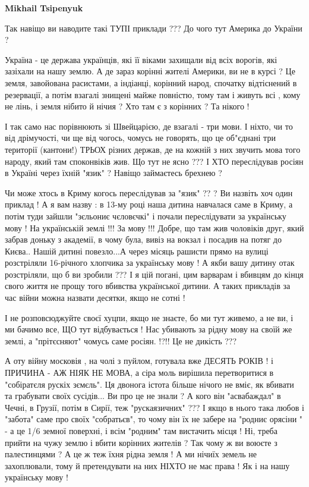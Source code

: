 \begin{itemize}
\begin{itemize}
\begin{itemize}
\textbf{Mikhail Tsipenyuk} 

Так навіщо ви наводите такі ТУПІ приклади ??? До чого тут Америка до України ?

Україна - це держава українців, які її віками захищали від всіх ворогів, які
зазіхали на нашу землю. А де зараз корінні жителі Америки, ви не в курсі ? Це
земля, завойована расистами, а індіанці, корінний народ, спочатку відтіснений в
резервації, а потім взагалі знищені майже повністю, тому там і живуть всі ,
кому не лінь, і земля нібито й нічия ? Хто там є з корінних ? Та нікого ! 

І так само нас порівнюють зі Швейцарією, де взагалі - три мови. І ніхто, чи то
від дрімучості, чи ще від чогось, чомусь не говорять, що це об"єднані три
території (кантони!) ТРЬОХ різних держав, де на кожній з них звучить мова того
народу, який там споконвіків жив. Що тут не ясно ??? І ХТО переслідував росіян
в Україні через їхній "язик" ? Навіщо займаєтесь брехнею ? 

Чи може хтось в Криму когось переслідував за "язик" ?? ? Ви назвіть хоч один
приклад ! А я вам назву : в 13-му році наша дитина навчалася саме в Криму, а
потім туди зайшли "зєльониє чєловєчкі" і почали переслідувати за українську
мову ! На українській землі !!! За мову !!! Добре, що там жив чоловіків друг,
який забрав доньку з академії, в чому була, вивіз на вокзал і посадив на потяг
до Києва.. Нашій дитині повезло...А через місяць рашисти прямо на вулиці
розстріляли 16-річного хлопчика за українську мову ! А якби вашу дитину отак
розстріляли, що б ви зробили ??? І я цій погані, цим варварам і вбивцям до
кінця свого життя не прощу того вбивства української дитини. А таких прикладів
за час війни можна назвати десятки, якщо не сотні ! 

І не розповсюджуйте своєї хуцпи, якщо не знаєте, бо ми тут живемо, а не ви, і
ми бачимо все, ЩО тут відбувається ! Нас убивають за рідну мову на своїй же
землі, а "прітєсняют" чомусь саме росіян.  !?!! Це не дикість ??? 

А оту війну московія , на чолі з пуйлом, готувала вже ДЕСЯТЬ РОКІВ ! і ПРИЧИНА
- АЖ НІЯК НЕ МОВА, а сіра моль вирішила перетворитися в "собіратєля рускіх
зємєль". Ця двонога істота більше нічого не вміє, як вбивати та грабувати своїх
сусідів... Ви про це не знали ? А кого він "асвабаждал" в Чечні, в Грузії,
потім в Сирії, теж "рускаязичних" ??? І якщо в нього така любов і "забота" саме
про своїх "собратьєв", то чому він їх не забере на "родниє орясіни " - а це 1/6
земної поверхні, і всім "родним" там вистачить місця ! Ні, треба прийти на чужу
землю і вбити корінних жителів ? Так чому ж ви воюєте з палестинцями ? А це ж
теж їхня рідна земля ! А ми нічиїх земель не захоплювали, тому й претендувати
на них НІХТО не має права ! Як і на нашу українську мову !


\end{itemize}
\end{itemize}
\end{itemize}
